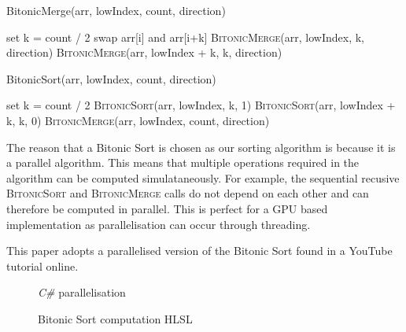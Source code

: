 \documentclass[12pt]{article}
\newcommand{\wideimage}[2][]{%
  \makebox[\textwidth][c]{\texttt{[image: \#2]}}%
}
\begin{document}
    \begin{algorithm}
        \caption{BitonicMerge(arr, lowIndex, count, direction)}
        \begin{algorithmic}[1]
                \State set k = count / 2
                        \State swap arr[i] and arr[i+k]
                    \EndIf
                \EndFor
                \State \textsc{BitonicMerge}(arr, lowIndex, k, direction)
                \State \textsc{BitonicMerge}(arr, lowIndex + k, k, direction)
            \EndIf
        \end{algorithmic}
    \end{algorithm}

    \begin{algorithm}
        \caption{BitonicSort(arr, lowIndex, count, direction)}
        \begin{algorithmic}[1]
                \State set k = count / 2
                \State \textsc{BitonicSort}(arr, lowIndex, k, 1)
                \State \textsc{BitonicSort}(arr, lowIndex + k, k, 0)
                \State \textsc{BitonicMerge}(arr, lowIndex, count, direction)
            \EndIf
        \end{algorithmic}
    \end{algorithm}

    The reason that a Bitonic Sort is chosen as our sorting algorithm is because it is a parallel algorithm. This means that multiple operations required in the algorithm can be computed simulataneously. For example, the sequential recusive \textsc{BitonicSort} and \textsc{BitonicMerge} calls do not depend on each other and can therefore be computed in parallel. This is perfect for a GPU based implementation as parallelisation can occur through threading.

    This paper adopts a parallelised version of the Bitonic Sort found in a YouTube tutorial online\cite{bitonicparallel}.

    \begin{figure}[H]
        \begin{center}
            \wideimage[width=\textwidth]{bitonicSortCSharp.png}
            \caption{\textit{C\#} parallelisation}
        \end{center}
    \end{figure}

    \begin{figure}[H]
        \begin{center}
            \wideimage[width=0.9\textwidth]{bitonicSortCompute.png}
            \caption{Bitonic Sort computation HLSL}
        \end{center}
    \end{figure}
\end{document}
